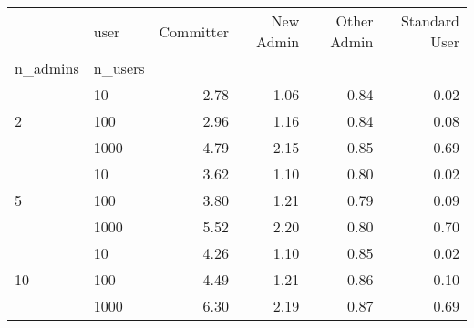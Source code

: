 \begin{tabular}{llrrrr}
\toprule
 & user & Committer & New Admin & Other Admin & Standard User \\
n_admins & n_users &  &  &  &  \\
\midrule
\multirow[t]{3}{*}{2} & 10 & 2.78 & 1.06 & 0.84 & 0.02 \\
 & 100 & 2.96 & 1.16 & 0.84 & 0.08 \\
 & 1000 & 4.79 & 2.15 & 0.85 & 0.69 \\
\cline{1-6}
\multirow[t]{3}{*}{5} & 10 & 3.62 & 1.10 & 0.80 & 0.02 \\
 & 100 & 3.80 & 1.21 & 0.79 & 0.09 \\
 & 1000 & 5.52 & 2.20 & 0.80 & 0.70 \\
\cline{1-6}
\multirow[t]{3}{*}{10} & 10 & 4.26 & 1.10 & 0.85 & 0.02 \\
 & 100 & 4.49 & 1.21 & 0.86 & 0.10 \\
 & 1000 & 6.30 & 2.19 & 0.87 & 0.69 \\
\cline{1-6}
\bottomrule
\end{tabular}
